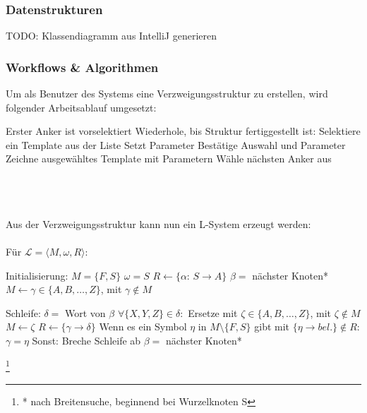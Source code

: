 \documentclass[11pt]{article}
\newcommand\blfootnote[1]{%
\begingroup
\renewcommand\thefootnote{}\footnote{#1}%
\addtocounter{footnote}{-1}%
\endgroup
}
\begin{document}
    \subsubsection{Datenstrukturen}
    TODO: Klassendiagramm aus IntelliJ generieren

    \subsubsection{Workflows \& Algorithmen}
    Um als Benutzer des Systems eine Verzweigungsstruktur zu erstellen, wird folgender Arbeitsablauf umgesetzt:
    \begin{algorithm}[caption={Erstellen einer Verzweigungsstruktur}, label={alg1}]
Erster Anker ist vorselektiert
Wiederhole, bis Struktur fertiggestellt ist:
    Selektiere ein Template aus der Liste
    Setzt Parameter
    Bestätige Auswahl und Parameter
    Zeichne ausgewähltes Template mit Parametern
    Wähle nächsten Anker aus
    \end{algorithm}
    \\~\\~\\
    Aus der Verzweigungsstruktur kann nun ein L-System erzeugt werden:
    \\~\\
    Für $\mathcal{L}=\langle M,\omega,R \rangle$:
    \begin{algorithm}[caption={Inferieren eines L-Systems aus einer Baumstruktur}, label={alg2}]
Initialisierung:
    $M=\{F,S\}$
    $\omega=S$
    $R \gets \{\alpha$: $S \rightarrow A\}$
    $\beta=$ nächster Knoten*
    $M \gets \gamma \in \{A,B,\dots,Z\}$, mit $\gamma \notin M$

Schleife:
    $\delta=$ Wort von $\beta$
    $\forall \{X,Y,Z\} \in \delta:$
        Ersetze mit $\zeta \in \{A,B,\dots,Z\}$, mit $\zeta \notin M$
        $M \gets \zeta$
    $R \gets \{\gamma\rightarrow\delta\}$
    Wenn es ein Symbol $\eta$ in $M\setminus\{F,S\}$ gibt mit $\{\eta \rightarrow bel.\} \notin R$:
        $\gamma=\eta$
    Sonst:
        Breche Schleife ab
    $\beta=$ nächster Knoten*
    \end{algorithm}
    \blfootnote{* nach Breitensuche, beginnend bei Wurzelknoten S}

    \newpage
\end{document}
